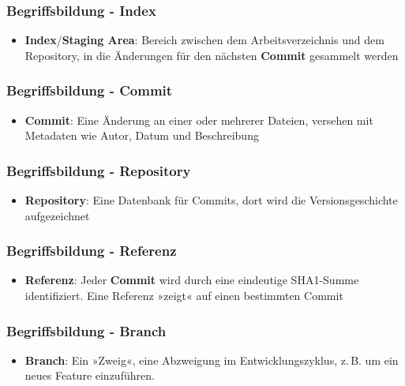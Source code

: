 \documentclass{beamer}
\begin{document}
\begin{frame}
\frametitle{Begriffsbildung - Index}



\begin{itemize}
	\item \textbf{Index}/\textbf{Staging Area}: Bereich zwischen dem Arbeitsverzeichnis und dem Repository, in die Änderungen für den nächsten \textbf{Commit} gesammelt werden
\end{itemize}


\end{frame}
\begin{frame}
\frametitle{Begriffsbildung - Commit}



\begin{itemize}
	\item \textbf{Commit}: Eine Änderung an einer oder mehrerer Dateien, versehen mit Metadaten wie Autor, Datum und Beschreibung
\end{itemize}


\end{frame}
\begin{frame}
\frametitle{Begriffsbildung - Repository}



\begin{itemize}
	\item \textbf{Repository}: Eine Datenbank für Commits, dort wird die Versionsgeschichte aufgezeichnet
\end{itemize}


\end{frame}
\begin{frame}
\frametitle{Begriffsbildung - Referenz}



\begin{itemize}
	\item \textbf{Referenz}: Jeder \textbf{Commit} wird durch eine eindeutige SHA1-Summe identifiziert. Eine Referenz »zeigt« auf einen bestimmten Commit
\end{itemize}


\end{frame}
\begin{frame}
\frametitle{Begriffsbildung - Branch}



\begin{itemize}
	\item \textbf{Branch}: Ein »Zweig«, eine Abzweigung im Entwicklungszyklus, z.\,B. um ein neues Feature einzuführen.
\end{itemize}


\end{frame}
\end{document}
